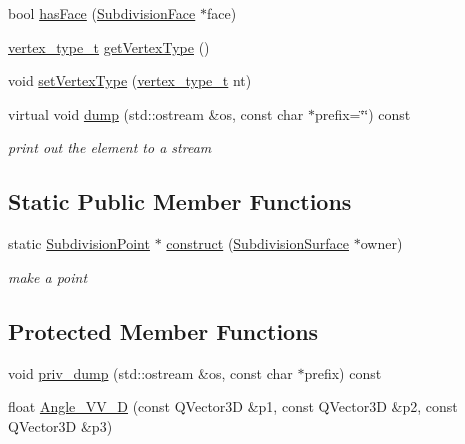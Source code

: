 \begin{DoxyCompactItemize}
bool \hyperlink{classShipCADGeometry_1_1SubdivisionPoint_a720d2fc986ba8a365e8722e0e3e28be5}{has\-Face} (\hyperlink{classShipCADGeometry_1_1SubdivisionFace}{Subdivision\-Face} $\ast$face)
\item 
\hyperlink{classShipCADGeometry_1_1SubdivisionPoint_a03df9289cd8543cd3a567fa6c8e44c43}{vertex\-\_\-type\-\_\-t} \hyperlink{classShipCADGeometry_1_1SubdivisionPoint_aca81609903ccd333db7f6f5f48d569ed}{get\-Vertex\-Type} ()
\item 
void \hyperlink{classShipCADGeometry_1_1SubdivisionPoint_a21d0f7b28fb19cb9f8d905c5f6eb9110}{set\-Vertex\-Type} (\hyperlink{classShipCADGeometry_1_1SubdivisionPoint_a03df9289cd8543cd3a567fa6c8e44c43}{vertex\-\_\-type\-\_\-t} nt)
\item 
virtual void \hyperlink{classShipCADGeometry_1_1SubdivisionPoint_aed72cf5e8dc67e980010d195f3a376a3}{dump} (std\-::ostream \&os, const char $\ast$prefix=\char`\"{}\char`\"{}) const 
\begin{DoxyCompactList}\small\item\em print out the element to a stream \end{DoxyCompactList}\end{DoxyCompactItemize}
\subsection*{Static Public Member Functions}
\begin{DoxyCompactItemize}
\item 
static \hyperlink{classShipCADGeometry_1_1SubdivisionPoint}{Subdivision\-Point} $\ast$ \hyperlink{classShipCADGeometry_1_1SubdivisionPoint_a8e907cca747b0483374d4fdde8eb4ad1}{construct} (\hyperlink{classShipCADGeometry_1_1SubdivisionSurface}{Subdivision\-Surface} $\ast$owner)
\begin{DoxyCompactList}\small\item\em make a point \end{DoxyCompactList}\end{DoxyCompactItemize}
\subsection*{Protected Member Functions}
\begin{DoxyCompactItemize}
\item 
void \hyperlink{classShipCADGeometry_1_1SubdivisionPoint_aa2d85a086268f335eefeaef0b48a96a1}{priv\-\_\-dump} (std\-::ostream \&os, const char $\ast$prefix) const 
\item 
float \hyperlink{classShipCADGeometry_1_1SubdivisionPoint_a72061d495903d8265f33bada30a0c416}{Angle\-\_\-\-V\-V\-\_\-D} (const Q\-Vector3\-D \&p1, const Q\-Vector3\-D \&p2, const Q\-Vector3\-D \&p3)
\end{DoxyCompactItemize}
